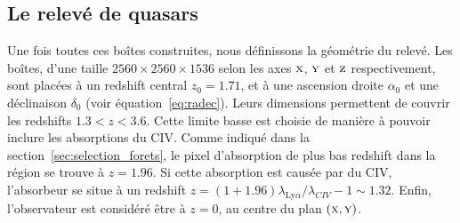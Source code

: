 \subsection{Le relevé de quasars}
\label{subsec:qso}
Une fois toutes ces boîtes construites, nous définissons la géométrie du relevé. Les boîtes, d'une taille $\num{2560}\times\num{2560}\times\num{1536}$ selon les axes $\textsc{x}$, $\textsc{y}$ et $\textsc{z}$ respectivement, sont placées à un redshift central $z_0 = \num{1.71}$, et à une ascension droite $\alpha_0$ et une déclinaison $\delta_0$ (voir équation~\ref{eq:radec}). Leurs dimensions permettent de couvrir les redshifts $\num{1.3} < z < \num{3.6}$.
Cette limite basse est choisie de manière à pouvoir inclure les absorptions du CIV. Comme indiqué dans la section~\ref{sec:selection_forets}, le pixel d'absorption de plus bas redshift dans la région \lya{}  se trouve à $z = \num{1.96}$. Si cette absorption est causée par du CIV, l'absorbeur se situe à un redshift $z = (1+\num{1.96}) \lambda_{\mathrm{Ly}\alpha} / \lambda_{CIV} - 1 \sim \num{1.32}$.
Enfin, l'observateur est considéré être à $z=0$, au centre du plan $(\textsc{x},\textsc{y})$.

